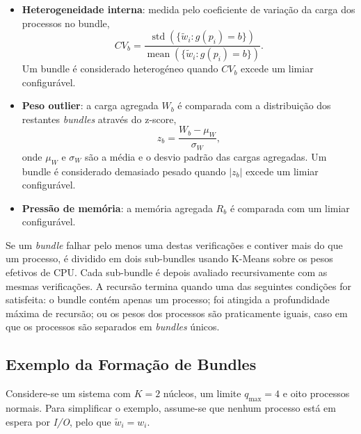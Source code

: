 \begin{itemize}
    \item \textbf{Heterogeneidade interna}: medida pelo coeficiente de variação da carga dos processos no bundle,
    \begin{equation}
        CV_b = \frac{\operatorname{std}\left(\{\tilde{w}_i : g(p_i)=b\}\right)}
                    {\operatorname{mean}\left(\{\tilde{w}_i : g(p_i)=b\}\right)}.
    \end{equation}
    Um bundle é considerado heterogéneo quando $CV_b$ excede um limiar configurável.

    \item \textbf{Peso outlier}: a carga agregada $W_b$ é comparada com a 
    distribuição dos restantes \textit{bundles} através do z-score,
    \begin{equation}
        z_b = \frac{W_b - \mu_W}{\sigma_W},
    \end{equation}
    onde $\mu_W$ e $\sigma_W$ são a média e o desvio padrão das cargas agregadas. 
    Um bundle é considerado demasiado pesado quando $|z_b|$ excede um limiar 
    configurável.

    \item \textbf{Pressão de memória}: a memória agregada $R_b$ é comparada com 
    um limiar configurável.
\end{itemize}

Se um \textit{bundle} falhar pelo menos uma destas verificações e contiver mais do 
que um processo, é dividido em dois sub-bundles usando K-Means sobre os pesos 
efetivos de \acs{CPU}. Cada sub-bundle é depois avaliado recursivamente com as 
mesmas verificações. A recursão termina quando uma das seguintes condições for 
satisfeita: o bundle contém apenas um processo; foi atingida a profundidade máxima 
de recursão; ou os pesos dos processos são praticamente iguais, caso em que os 
processos são separados em \textit{bundles} únicos.

\subsection{Exemplo da Formação de Bundles}

Considere-se um sistema com $K=2$ núcleos, um limite $q_{\max}=4$ e oito
processos normais. Para simplificar o exemplo, assume-se que nenhum processo
está em espera por \textit{I/O}, pelo que $\tilde{w}_i=w_i$.

